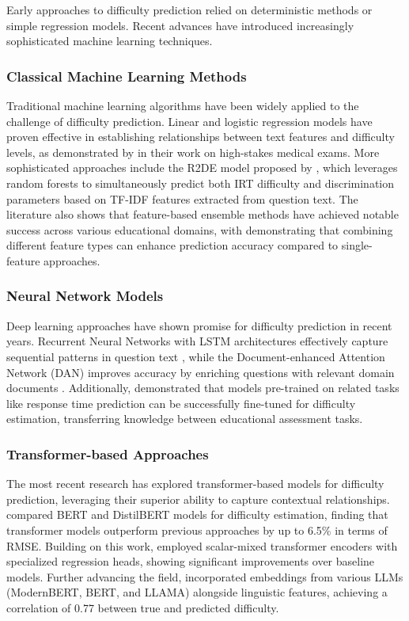 \documentclass[11pt]{article}
\begin{document}
Early approaches to difficulty prediction relied on deterministic methods or simple regression models. Recent advances have introduced increasingly sophisticated machine learning techniques.

\subsubsection{Classical Machine Learning Methods}

Traditional machine learning algorithms have been widely applied to the challenge of difficulty prediction. Linear and logistic regression models have proven effective in establishing relationships between text features and difficulty levels, as demonstrated by \citet{yaneva2019predicting} in their work on high-stakes medical exams. More sophisticated approaches include the R2DE model proposed by \citet{benedetto2020r2de}, which leverages random forests to simultaneously predict both IRT difficulty and discrimination parameters based on TF-IDF features extracted from question text. The literature also shows that feature-based ensemble methods have achieved notable success across various educational domains, with \citet{yaneva2019predicting} demonstrating that combining different feature types can enhance prediction accuracy compared to single-feature approaches.

\subsubsection{Neural Network Models}

Deep learning approaches have shown promise for difficulty prediction in recent years. Recurrent Neural Networks with LSTM architectures effectively capture sequential patterns in question text \citep{huang2017question}, while the Document-enhanced Attention Network (DAN) improves accuracy by enriching questions with relevant domain documents \citep{qiu2019question}. Additionally, \citet{xue2020predicting} demonstrated that models pre-trained on related tasks like response time prediction can be successfully fine-tuned for difficulty estimation, transferring knowledge between educational assessment tasks.

\subsubsection{Transformer-based Approaches}

The most recent research has explored transformer-based models for difficulty prediction, leveraging their superior ability to capture contextual relationships. \citet{benedetto2021transformers} compared BERT and DistilBERT models for difficulty estimation, finding that transformer models outperform previous approaches by up to 6.5\% in terms of RMSE. Building on this work, \citet{gombert2024predicting} employed scalar-mixed transformer encoders with specialized regression heads, showing significant improvements over baseline models. Further advancing the field, \citet{kapoor2025prediction} incorporated embeddings from various LLMs (ModernBERT, BERT, and LLAMA) alongside linguistic features, achieving a correlation of 0.77 between true and predicted difficulty.
\end{document}
